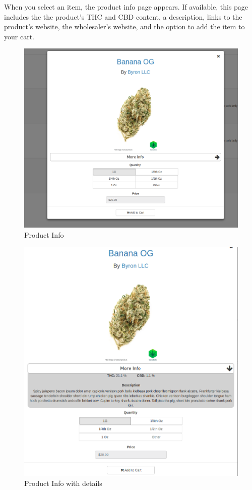 \documentclass[]{book}
\theoremstyle{definition}
\theoremstyle{definition}
\theoremstyle{definition}
\theoremstyle{remark}
\begin{document}
When you select an item, the product info page appears. If available,
this page includes the the product's THC and CBD content, a description,
links to the product's website, the wholesaler's website, and the option
to add the item to your cart.

\begin{figure}
\centering
\includegraphics{images/M3.png}
\caption{Product Info}
\end{figure}

\begin{figure}
\centering
\includegraphics{images/M4.png}
\caption{Product Info with details}
\end{figure}
\end{document}
